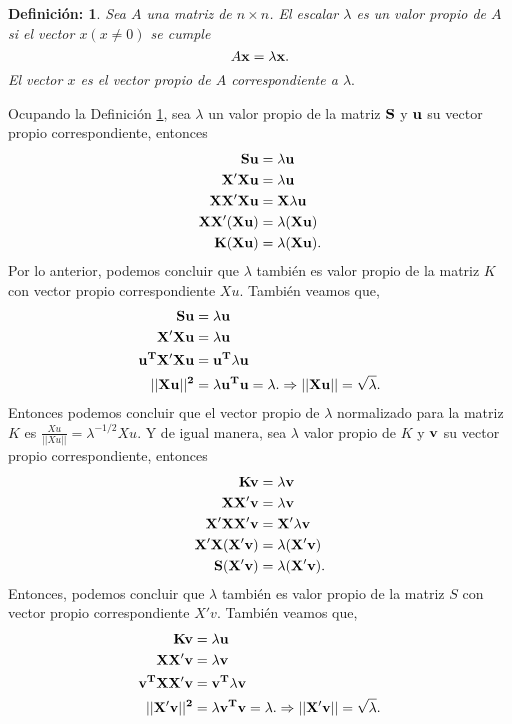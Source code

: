 \documentclass[paper=letter, fontsize=11pt]{scrartcl}
\newtheorem{thmd}{Definición:}
\numberwithin{equation}{section} %
\numberwithin{figure}{section} %
\numberwithin{table}{section} %
\begin{document}
\begin{framed}
    \begin{thmd} \label{d_eigenvalor}
	Sea $A$ una matriz de $n\times n$. El escalar $\lambda$ es un valor propio de $A$ si el vector $x (x\neq 0)$ se cumple
	$$A\bf x =\lambda x.$$
	El vector $x$ es el vector propio de $A$ correspondiente a $\lambda.$ \cite{algebra_lineal_1}
    \end{thmd}
\end{framed}

Ocupando la Definición \ref{d_eigenvalor}, sea $\lambda$ un valor propio de la matriz $\bf S$ y $\bf u$ su vector propio correspondiente, entonces 
\begin{align*}
    \bf Su &= \bf \lambda u\\
    \bf X'X u   &= \bf \lambda u\\
    \bf X X'X u &= \bf X\lambda u\\
    \bf X X' (Xu)&=\bf \lambda (Xu)\\
    \bf K (Xu) &= \bf \lambda (Xu).
\end{align*}
Por lo anterior, podemos concluir que $\lambda$ también es valor propio de la matriz $K$ con vector propio correspondiente $Xu$. También veamos que,
\begin{align*}
    \bf Su &= \bf \lambda u\\
    \bf X'X u   &= \bf \lambda u\\
    \bf u^TX'X u &= \bf u^T\lambda u\\
    \bf || Xu||^2 & = \bf \lambda u^T u = \lambda. \Rightarrow ||Xu|| =\sqrt{\lambda}.
\end{align*}
Entonces podemos concluir que el vector propio de $\lambda$ normalizado para la matriz $K$ es $\frac{Xu}{||Xu||}=\lambda^{-1/2}Xu.$ Y de igual manera, sea $\lambda$ valor propio de $K$ y $\bf{v}$ su vector propio correspondiente, entonces
\begin{align*}
    \bf Kv &= \bf \lambda v\\
    \bf XX' v   &= \bf \lambda v\\
    \bf X' XX' v &= \bf X'\lambda v\\
    \bf X' X (X'v)&=\bf \lambda (X'v)\\
    \bf S (X'v) &= \bf \lambda (X'v).
\end{align*}
Entonces, podemos concluir que $\lambda$ también es valor propio de la matriz $S$ con vector propio correspondiente $X'v$. También veamos que,
\begin{align*}
    \bf Kv &= \bf \lambda u\\
    \bf XX' v   &= \bf \lambda v\\
    \bf v^TXX' v &= \bf v^T\lambda v\\
    \bf || X'v||^2 & = \bf \lambda v^T v = \lambda. \Rightarrow ||X'v|| =\sqrt{\lambda}.
\end{align*}
\end{document}
